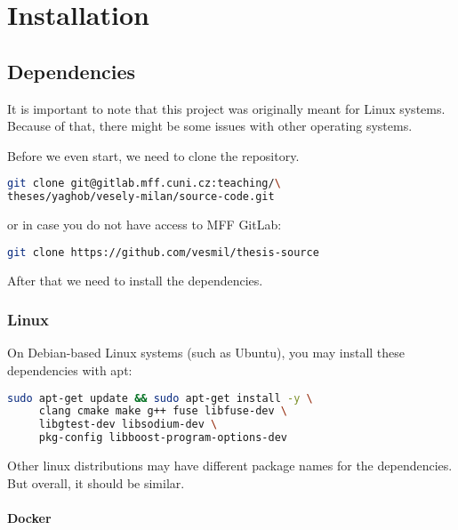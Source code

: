 \chapter{Installation}

\section{Dependencies}\label{sec:dependencies}

It is important to note that this project was originally meant for Linux systems.
Because of that, there might be some issues with other operating systems.

Before we even start, we need to clone the repository.

\begin{lstlisting}[language=bash, basicstyle=\ttfamily\small]
git clone git@gitlab.mff.cuni.cz:teaching/\
theses/yaghob/vesely-milan/source-code.git
\end{lstlisting}

or in case you do not have access to MFF GitLab:

\begin{lstlisting}[language=bash, basicstyle=\ttfamily\small]
git clone https://github.com/vesmil/thesis-source
\end{lstlisting}

After that we need to install the dependencies.

\subsection*{Linux}

On Debian-based Linux systems (such as Ubuntu), you may install these dependencies with apt:

\begin{lstlisting}[language=bash, basicstyle=\ttfamily\small]
sudo apt-get update && sudo apt-get install -y \
     clang cmake make g++ fuse libfuse-dev \
     libgtest-dev libsodium-dev \
     pkg-config libboost-program-options-dev
\end{lstlisting}

Other linux distributions may have different package names for the dependencies.
But overall, it should be similar.

\subsubsection*{Docker}\label{subsubsec:docker-guide}

